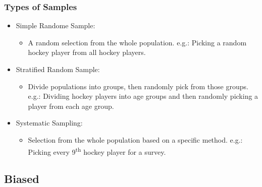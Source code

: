 \documentclass{beamer}
\begin{document}
    \begin{frame}
        \frametitle{Types of Samples}
        \begin{itemize}
            \item Simple Randome Sample:
            \begin{itemize}
                \item[] A random selection from the whole population.
                \newline e.g.: Picking a random hockey player from all hockey players. \newline 
            \end{itemize}
            \pause
            \item Stratified Random Sample:
            \begin{itemize}
                \item[] Divide populations into groups, then randomly pick from those groups. \newline
                e.g.: Dividing hockey players into age groups and then randomly picking a player 
                    from each age group. \newline
            \end{itemize}
            \pause
            \item Systematic Sampling:
            \begin{itemize}
                \item[] Selection from the whole population based on a specific method. \newline
                    e.g.: Picking every 9\textsuperscript{th} hockey player for a survey.
            \end{itemize}
        \end{itemize}
    \end{frame}

    \subsection{Biased}
\end{document}

